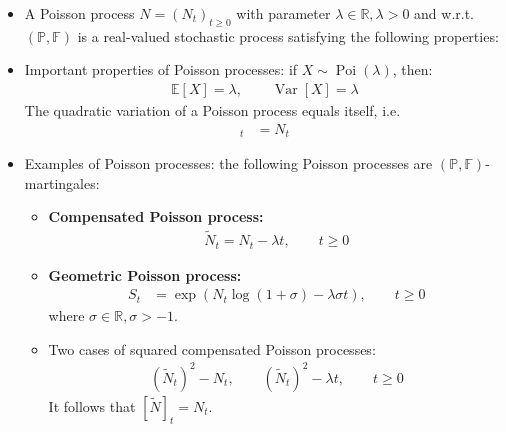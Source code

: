 \documentclass[a4paper,landscape,8pt,fleqn]{scrartcl}
\renewcommand{\emph}[1]{\textbf{#1}}
\DeclareMathOperator{\Var}{Var}				%
\DeclareMathOperator{\Poi}{Poi}					%
\begin{document}
\begin{multicols*}{3}
\begin{itemize}
\item A Poisson process $N = (N_t)_{t \geq 0}$ with parameter $\lambda \in \mathbb{R}, \lambda > 0$ and w.r.t. $(\mathbb{P},\mathbb{F})$ is a real-valued stochastic process satisfying the following properties:
\item Important properties of Poisson processes: if $X \sim \Poi(\lambda)$, then:
\begin{align*}
\mathbb{E}[X] = \lambda, \qquad \Var[X] = \lambda
\end{align*}
The quadratic variation of a Poisson process equals itself, i.e.
\begin{align*}
[N]_t &= N_t
\end{align*}
\item Examples of Poisson processes: the following Poisson processes are $(\mathbb{P},\mathbb{F})$-martingales:
\begin{itemize}
\item \emph{Compensated Poisson process:}
\begin{align*}
\tilde N_t = N_t - \lambda t, \qquad t \geq 0
\end{align*}
\item \emph{Geometric Poisson process:}
\begin{align*}
S_t &= \exp \left( N_t \log(1+\sigma) - \lambda \sigma t \right), \qquad t \geq 0
\end{align*}
where $\sigma \in \mathbb{R}, \sigma > -1$.
\item Two cases of squared compensated Poisson processes:
\begin{align*}
\left( \tilde N_t \right)^2 - N_t, \qquad \left( \tilde N_t \right)^2 - \lambda t, \qquad t \geq 0
\end{align*}
It follows that $[\tilde N]_t = N_t$.
\end{itemize}
\end{itemize}


\end{multicols*}
\end{document}
